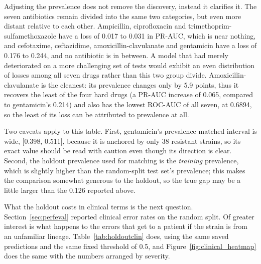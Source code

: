 Adjusting the prevalence does not remove the discovery, instead it clarifies
it. The seven antibiotics remain divided into the same two categories, but
even more distant relative to each other. Ampicillin, ciprofloxacin and
trimethoprim-sulfamethoxazole have a loss of 0.017 to 0.031 in PR-AUC, which
is near nothing, and cefotaxime, ceftazidime, amoxicillin-clavulanate and
gentamicin have a loss of 0.176 to 0.244, and no antibiotic is in between. A
model that had merely deteriorated on a more challenging set of tests would
exhibit an even distribution of losses among all seven drugs rather than this
two group divide. Amoxicillin-clavulanate is the cleanest: its prevalence
changes only by 5.9 points, thus it recovers the least of the four hard drugs
(a PR-AUC increase of 0.065, compared to gentamicin's 0.214) and also has the
lowest ROC-AUC of all seven, at 0.6894, so the least of its loss can be
attributed to prevalence at all.

Two caveats apply to this table. First, gentamicin's prevalence-matched
interval is wide, [0.398, 0.511], because it is anchored by only 38 resistant
strains, so its exact value should be read with caution even though its
direction is clear. Second, the holdout prevalence used for matching is the
\textit{training} prevalence, which is slightly higher than the random-split
test set's prevalence; this makes the comparison somewhat generous to the
holdout, so the true gap may be a little larger than the 0.126 reported
above.

\vspace{1em}

What the holdout costs in clinical terms is the next question.
Section~\ref{sec:perfeval} reported clinical error rates on the random split. Of
greater interest is what happens to the errors that get to a patient if the
strain is from an unfamiliar lineage. Table~\ref{tab:holdoutclin} does, using the
same saved predictions and the same fixed threshold of 0.5, and
Figure~\ref{fig:clinical_heatmap} does the same with the numbers arranged by
severity.

